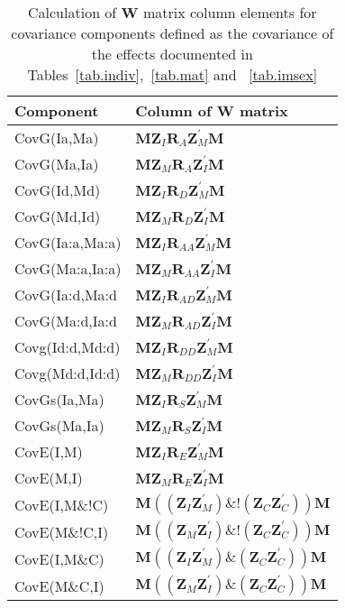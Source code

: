 \begin{table}
\centering
\caption{Calculation of ${\bm W}$ matrix column elements for covariance components defined as the covariance of the effects documented in Tables~\ref{tab.indiv},~\ref{tab.mat} and ~\ref{tab.imsex}}
\label{tab.wcol2}
\vspace{0.1in}
\begin{tabular}{l|l}
Component & Column of ${\bm W}$ matrix \\ \hline
CovG(Ia,Ma)   &  ${\bm M \bm Z_{I} \bm R_{A} \bm Z_{M}^{\prime} \bm M }$    \\
CovG(Ma,Ia)   &  ${\bm M \bm Z_{M} \bm R_{A} \bm Z_{I}^{\prime} \bm M }$    \\
CovG(Id,Md)   &  ${\bm M \bm Z_{I} \bm R_{D} \bm Z_{M}^{\prime} \bm M }$   \\
CovG(Md,Id)   &  ${\bm M \bm Z_{M} \bm R_{D} \bm Z_{I}^{\prime} \bm M }$   \\
CovG(Ia:a,Ma:a)   &  ${\bm M \bm Z_{I} \bm R_{AA} \bm Z_{M}^{\prime} \bm M }$   \\
CovG(Ma:a,Ia:a)   &  ${\bm M \bm Z_{M} \bm R_{AA} \bm Z_{I}^{\prime} \bm M }$   \\
CovG(Ia:d,Ma:d    &  ${\bm M \bm Z_{I} \bm R_{AD} \bm Z_{M}^{\prime} \bm M }$  \\
CovG(Ma:d,Ia:d    &  ${\bm M \bm Z_{M} \bm R_{AD} \bm Z_{I}^{\prime} \bm M }$  \\
Covg(Id:d,Md:d)   &  ${\bm M \bm Z_{I} \bm R_{DD} \bm Z_{M}^{\prime} \bm M }$  \\
Covg(Md:d,Id:d)   &  ${\bm M \bm Z_{M} \bm R_{DD} \bm Z_{I}^{\prime} \bm M }$  \\
CovGs(Ia,Ma)     &  ${\bm M \bm Z_{I} \bm R_{S} \bm Z_{M}^{\prime} \bm M }$  \\
CovGs(Ma,Ia)     &  ${\bm M \bm Z_{M} \bm R_{S} \bm Z_{I}^{\prime} \bm M }$  \\ \hline
CovE(I,M)       &  ${\bm M \bm Z_{I} \bm R_{E} \bm Z_{M}^{\prime} \bm M }$  \\
CovE(M,I)       &  ${\bm M \bm Z_{M} \bm R_{E} \bm Z_{I}^{\prime} \bm M }$  \\
CovE(I,M\&!C)   &  ${\bm M ((\bm Z_{I} \bm Z_{M}^{\prime}) \&! (\bm Z_{C} \bm Z_{C}^{\prime})) \bm M }$  \\  
CovE(M\&!C,I)   &  ${\bm M ((\bm Z_{M} \bm Z_{I}^{\prime}) \&! (\bm Z_{C} \bm Z_{C}^{\prime})) \bm M }$  \\  
CovE(I,M\&C)    &  ${\bm M ((\bm Z_{I} \bm Z_{M}^{\prime}) \& (\bm Z_{C} \bm Z_{C}^{\prime})) \bm M }$  \\
CovE(M\&C,I)    &  ${\bm M ((\bm Z_{M} \bm Z_{I}^{\prime}) \& (\bm Z_{C} \bm Z_{C}^{\prime})) \bm M }$  \\ \hline
\end{tabular}
\end{table}

